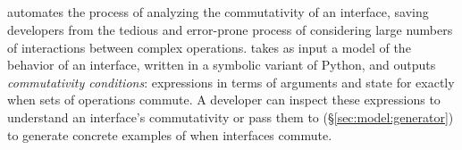 \subsection{\analyzer{}}
\label{sec:model:analyzer}

\cbstart
%
\analyzer automates the process of analyzing the commutativity of an
interface, saving developers from the tedious and error-prone process of
considering large numbers of interactions between complex operations.
%
\analyzer takes as input a model of the behavior of an interface,
written in a symbolic variant of Python, and outputs \emph{commutativity
  conditions}: expressions in terms of arguments and state for exactly
when sets of operations commute.
%
A developer can inspect these expressions to understand an interface's
commutativity or pass them to \generator (\S\ref{sec:model:generator})
to generate concrete examples of when interfaces commute.



%
%
%

